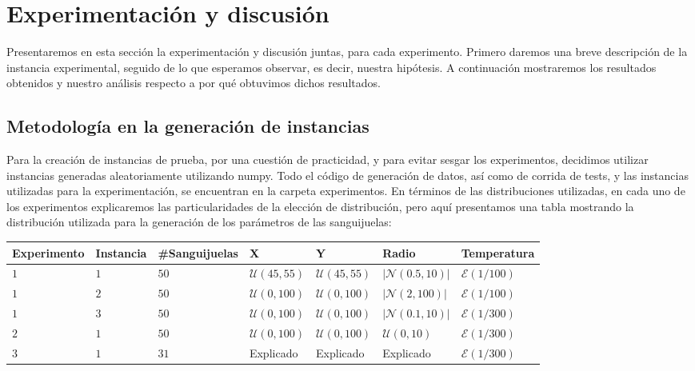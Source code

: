 \section{Experimentación y discusión}

Presentaremos en esta sección la experimentación y discusión juntas, para cada experimento. Primero 
daremos una breve descripción de la instancia 
experimental, seguido de lo que esperamos observar, es decir, nuestra hipótesis. A continuación mostraremos los 
resultados obtenidos y nuestro análisis respecto a por qué obtuvimos dichos resultados. 

\subsection{Metodología en la generación de instancias}

Para la creación de instancias de prueba, por una cuestión de practicidad, y para evitar sesgar los experimentos, decidimos utilizar instancias generadas aleatoriamente utilizando numpy. Todo el código de generación de datos, así como de corrida de tests, y las instancias utilizadas para la experimentación, se encuentran en la carpeta experimentos. En términos de las distribuciones utilizadas, en cada uno de los experimentos explicaremos las particularidades de la elección de distribución, pero aquí presentamos una tabla mostrando la distribución utilizada para la generación de los parámetros de las sanguijuelas:

\begin{center}
\begin{tabular}{l | l | l | l | l | l | l}
Experimento & Instancia & \#Sanguijuelas & X & Y & Radio & Temperatura\\ \hline
$1$ & $1$ & $50$ & $\mathcal{U}(45, 55)$ & $\mathcal{U}(45, 55)$ & $|\mathcal{N}(0.5, 10)|$ & $\mathcal{E}(1/100)$\\ \hline
$1$ & $2$ & $50$ & $\mathcal{U}(0, 100)$ & $\mathcal{U}(0, 100)$ & $|\mathcal{N}(2, 100)|$ & $\mathcal{E}(1/100)$\\ \hline
$1$ & $3$ & $50$ & $\mathcal{U}(0, 100)$ & $\mathcal{U}(0, 100)$ & $|\mathcal{N}(0.1, 10)|$ & $\mathcal{E}(1/300)$\\ \hline
$2$ & $1$ & $50$ & $\mathcal{U}(0, 100)$ & $\mathcal{U}(0, 100)$ & $\mathcal{U}(0, 10)$ & $\mathcal{E}(1/300)$\\ \hline
$3$ & $1$ & $31$ & Explicado & Explicado & Explicado & $\mathcal{E}(1/300)$\\ \hline
\end{tabular}
\end{center}

